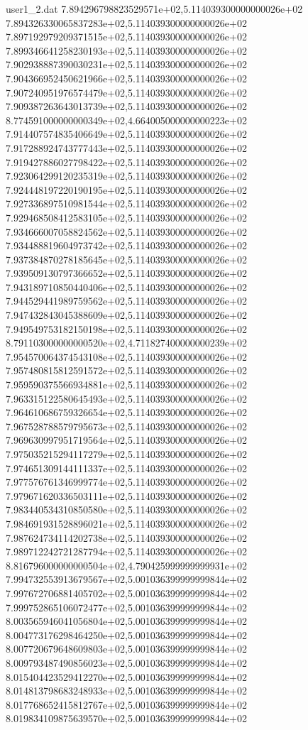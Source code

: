 \begin{filecontents}{user1_2.dat}
7.894296798823529571e+02,5.114039300000000026e+02
7.894326330065837283e+02,5.114039300000000026e+02
7.897192979209371515e+02,5.114039300000000026e+02
7.899346641258230193e+02,5.114039300000000026e+02
7.902938887390030231e+02,5.114039300000000026e+02
7.904366952450621966e+02,5.114039300000000026e+02
7.907240951976574479e+02,5.114039300000000026e+02
7.909387263643013739e+02,5.114039300000000026e+02
8.774591000000000349e+02,4.664005000000000223e+02
7.914407574835406649e+02,5.114039300000000026e+02
7.917288924743777443e+02,5.114039300000000026e+02
7.919427886027798422e+02,5.114039300000000026e+02
7.923064299120235319e+02,5.114039300000000026e+02
7.924448197220190195e+02,5.114039300000000026e+02
7.927336897510981544e+02,5.114039300000000026e+02
7.929468508412583105e+02,5.114039300000000026e+02
7.934666007058824562e+02,5.114039300000000026e+02
7.934488819604973742e+02,5.114039300000000026e+02
7.937384870278185645e+02,5.114039300000000026e+02
7.939509130797366652e+02,5.114039300000000026e+02
7.943189710850440406e+02,5.114039300000000026e+02
7.944529441989759562e+02,5.114039300000000026e+02
7.947432843045388609e+02,5.114039300000000026e+02
7.949549753182150198e+02,5.114039300000000026e+02
8.791103000000000520e+02,4.711827400000000239e+02
7.954570064374543108e+02,5.114039300000000026e+02
7.957480815812591572e+02,5.114039300000000026e+02
7.959590375566934881e+02,5.114039300000000026e+02
7.963315122580645493e+02,5.114039300000000026e+02
7.964610686759326654e+02,5.114039300000000026e+02
7.967528788579795673e+02,5.114039300000000026e+02
7.969630997951719564e+02,5.114039300000000026e+02
7.975035215294117279e+02,5.114039300000000026e+02
7.974651309144111337e+02,5.114039300000000026e+02
7.977576761346999774e+02,5.114039300000000026e+02
7.979671620336503111e+02,5.114039300000000026e+02
7.983440534310850580e+02,5.114039300000000026e+02
7.984691931528896021e+02,5.114039300000000026e+02
7.987624734114202738e+02,5.114039300000000026e+02
7.989712242721287794e+02,5.114039300000000026e+02
8.816796000000000504e+02,4.790425999999999931e+02
7.994732553913679567e+02,5.001036399999999844e+02
7.997672706881405702e+02,5.001036399999999844e+02
7.999752865106072477e+02,5.001036399999999844e+02
8.003565946041056804e+02,5.001036399999999844e+02
8.004773176298464250e+02,5.001036399999999844e+02
8.007720679648609803e+02,5.001036399999999844e+02
8.009793487490856023e+02,5.001036399999999844e+02
8.015404423529412270e+02,5.001036399999999844e+02
8.014813798683248933e+02,5.001036399999999844e+02
8.017768652415812767e+02,5.001036399999999844e+02
8.019834109875639570e+02,5.001036399999999844e+02

\end{filecontents}
